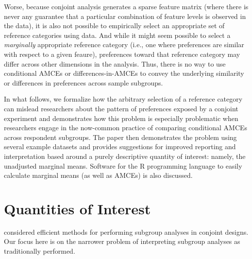 \documentclass[a4paper,12pt]{article}\usepackage[]{graphicx}\usepackage[]{color}
\begin{document}
Worse, because conjoint analysis generates a sparse feature matrix (where there is never any guarantee that a particular combination of feature levels is observed in the data), it is also not possible to empirically select an appropriate set of reference categories using data. And while it might seem possible to select a \textit{marginally} appropriate reference category (i.e., one where preferences are similar with respect to a given feaure), preferences toward that reference category may differ across other dimensions in the analysis. Thus, there is no way to use conditional AMCEs or differences-in-AMCEs to convey the underlying similarity or differences in preferences across sample subgroups.

In what follows, we formalize how the arbitrary selection of a reference category can mislead researchers about the pattern of preferences exposed by a conjoint experiment and demonstrates how this problem is especially problematic when researchers engage in the now-common practice of comparing conditional AMCEs across respondent subgroups. The paper then demonstrates the problem using several example datasets and provides suggestions for improved reporting and interpretation based around a purely descriptive quantity of interest: namely, the unadjusted marginal means. Software for the R programming language to easily calculate marginal means (as well as AMCEs) is also discussed.


\section{Quantities of Interest}





\citet{RatkovicTingley2017} considered efficient methods for performing subgroup analyses in conjoint designs. Our focus here is on the narrower problem of interpreting subgroup analyses as traditionally performed.
\end{document}

